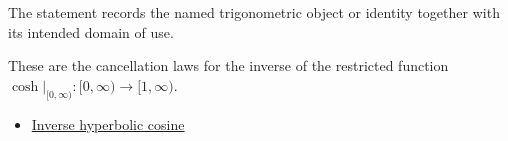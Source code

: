 \begin{remark*}[Interpretation]
The statement records the named trigonometric object or identity together with
its intended domain of use.
\end{remark*}

\begin{remark*}[Proof]
These are the cancellation laws for the inverse of the restricted function
$\cosh|_{[0,\infty)}:[0,\infty)\to[1,\infty)$.
\end{remark*}
\begin{dependencies}
\begin{itemize}
  \item \hyperref[def:inverse-hyperbolic-cosine]{Inverse hyperbolic cosine}
\end{itemize}
\end{dependencies}
